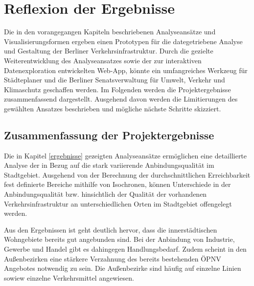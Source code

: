 \newpage
\section{Reflexion der Ergebnisse} \label{fazit}
Die in den vorangegangen Kapiteln beschriebenen Analyseansätze und Visualisierungsformen ergeben einen Prototypen für die dategetriebene Analyse und Gestaltung der Berliner Verkehrsinfrastruktur. Durch die gezielte Weiterentwicklung des Analyseansatzes sowie der zur interaktiven Datenexploration entwickelten Web-App, könnte ein umfangreiches Werkzeug für Städteplaner und die Berliner Senatsverwaltung für Umwelt, Verkehr und Klimaschutz geschaffen werden. Im Folgenden werden die Projektergebnisse zusammenfassend dargestellt. Ausgehend davon werden die Limitierungen des gewählten Ansatzes beschrieben und mögliche nächste Schritte skizziert.

\subsection{Zusammenfassung der Projektergebnisse}
Die in Kapitel \ref{ergebnisse} gezeigten Analyseansätze ermöglichen eine detaillierte Analyse der in Bezug auf die stark variierende Anbindungsqualität im Stadtgebiet. Ausgehend von der Berechnung der durchschnittlichen Erreichbarkeit fest definierte Bereiche mithilfe von Isochronen, können Unterschiede in der Anbindungsqualität bzw. hinsichtlich der Qualität der vorhandenen Verkehrsinfrastruktur an unterschiedlichen Orten im Stadtgebiet offengelegt werden.

Aus den Ergebnissen ist geht deutlich hervor, dass die innerstädtischen Wohngebiete bereits gut angebunden sind. Bei der Anbindung von Industrie, Gewerbe und Handel gibt es dahingegen Handlungsbedarf. Zudem scheint in den Außenbezirken eine stärkere Verzahnung des bereits bestehenden ÖPNV Angebotes notwendig zu sein. Die Außenbezirke sind häufig auf einzelne Linien sowiew einzelne Verkehrsmittel angewiesen.



